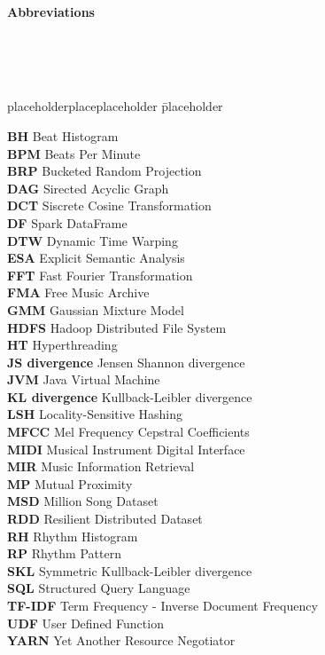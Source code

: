 \documentclass[a4paper,oneside,12pt]{report}
\begin{document}
\begin{flushleft}
\begin{Huge}
\textbf{Abbreviations}
\end{Huge}
\end{flushleft}

\ \\
\ \\
\ \\

\begin{tabbing}
placeholderplaceplaceholder \= placeholder \kill

\textbf{BH} \> Beat Histogram\\
\textbf{BPM} \> Beats Per Minute\\
\textbf{BRP} \> Bucketed Random Projection\\
\textbf{DAG} \> Sirected Acyclic Graph\\
\textbf{DCT} \> Siscrete Cosine Transformation\\
\textbf{DF} \> Spark DataFrame\\
\textbf{DTW} \> Dynamic Time Warping\\
\textbf{ESA} \> Explicit Semantic Analysis\\
\textbf{FFT} \> Fast Fourier Transformation\\
\textbf{FMA} \> Free Music Archive\\
\textbf{GMM} \> Gaussian Mixture Model\\
\textbf{HDFS} \> Hadoop Distributed File System\\
\textbf{HT} \> Hyperthreading\\
\textbf{JS divergence} \> Jensen Shannon divergence\\
\textbf{JVM} \> Java Virtual Machine\\
\textbf{KL divergence} \> Kullback-Leibler divergence\\
\textbf{LSH} \> Locality-Sensitive Hashing\\
\textbf{MFCC} \> Mel Frequency Cepstral Coefficients\\
\textbf{MIDI} \> Musical Instrument Digital Interface\\
\textbf{MIR} \> Music Information Retrieval\\
\textbf{MP} \> Mutual Proximity\\
\textbf{MSD} \> Million Song Dataset\\
\textbf{RDD} \> Resilient Distributed Dataset\\
\textbf{RH} \> Rhythm Histogram\\
\textbf{RP} \> Rhythm Pattern\\
\textbf{SKL} \> Symmetric Kullback-Leibler divergence\\
\textbf{SQL} \> Structured Query Language\\
\textbf{TF-IDF} \> Term Frequency - Inverse Document Frequency\\
\textbf{UDF} \> User Defined Function\\
\textbf{YARN} \> Yet Another Resource Negotiator\\



\end{tabbing}
\end{document}
